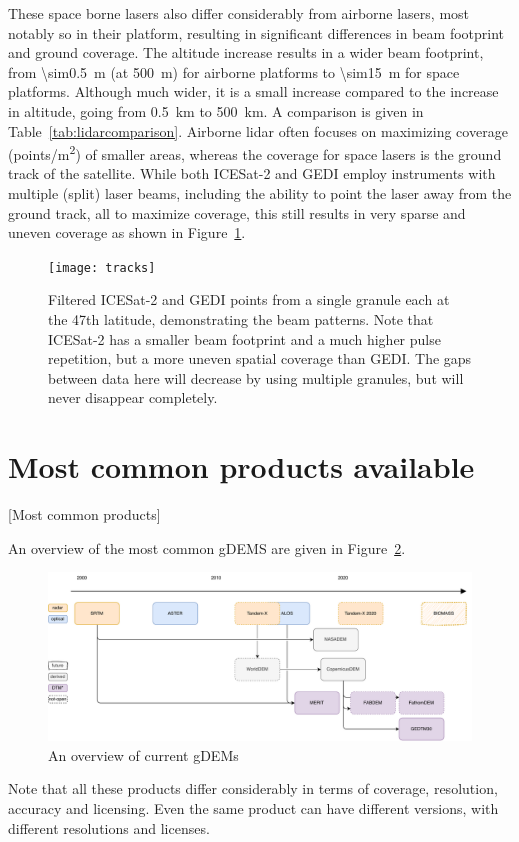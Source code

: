 These space borne lasers also differ considerably from airborne lasers, most notably so in their platform, resulting in significant differences in beam footprint and ground coverage.
The altitude increase results in a wider beam footprint, from \qty{\sim0.5}{m} (at \qty{500}{m}) for airborne platforms to \qty{\sim15}{m} for space platforms.
Although much wider, it is a small increase compared to the increase in altitude, going from \qty{0.5}{km} to \qty{500}{km}.
A comparison is given in Table~\ref{tab:lidarcomparison}.
Airborne lidar often focuses on maximizing coverage (\unit{points/m^2}) of smaller areas, whereas the coverage for space lasers is the ground track of the satellite.
While both ICESat-2 and GEDI employ instruments with multiple (split) laser beams, including the ability to point the laser away from the ground track, all to maximize coverage, this still results in very sparse and uneven coverage as shown in Figure~\ref{fig:beams}.
\begin{figure}
  \centering
  \texttt{[image: tracks]}
  \caption{Filtered ICESat-2 and GEDI points from a single granule each at the 47th latitude, demonstrating the beam patterns.
    Note that ICESat-2 has a smaller beam footprint and a much higher pulse repetition, but a more uneven spatial coverage than GEDI\@.
    The gaps between data here will decrease by using multiple granules, but will never disappear completely.}%
  \label{fig:beams}
\end{figure}


%
\section{Most common products available}[Most common products]

An overview of the most common gDEMS are given in Figure~\ref{fig:gdem_inheritance}.
\begin{figure}
  \centering
  \includegraphics[width=\linewidth]{dems_overview}
  \caption{An overview of current gDEMs}%
  \label{fig:gdem_inheritance}
\end{figure}
Note that all these products differ considerably in terms of coverage, resolution, accuracy and licensing.
Even the same product can have different versions, with different resolutions and licenses.

